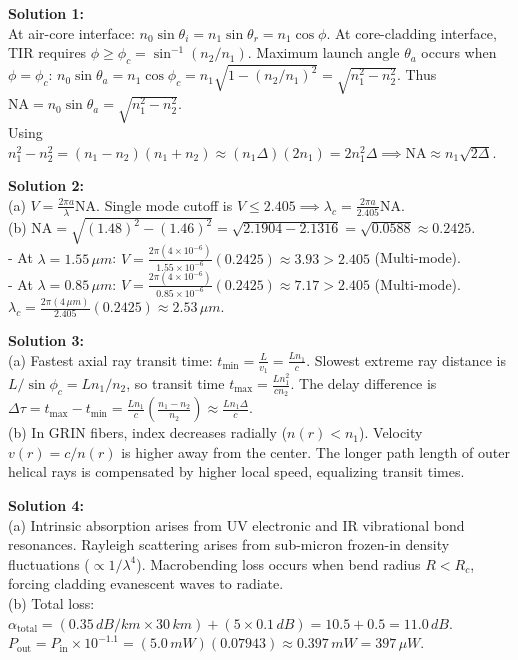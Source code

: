 \begin{solutionbox}
\textbf{Solution 1:}\\
At air-core interface: $n_0 \sin\theta_i = n_1 \sin\theta_r = n_1 \cos\phi$. At core-cladding interface, TIR requires $\phi \ge \phi_c = \sin^{-1}(n_2/n_1)$. Maximum launch angle $\theta_a$ occurs when $\phi = \phi_c$:
$n_0 \sin\theta_a = n_1 \cos\phi_c = n_1 \sqrt{1 - (n_2/n_1)^2} = \sqrt{n_1^2 - n_2^2}$. Thus $\text{NA} = n_0 \sin\theta_a = \sqrt{n_1^2 - n_2^2}$.\\
Using $n_1^2 - n_2^2 = (n_1 - n_2)(n_1 + n_2) \approx (n_1 \Delta)(2n_1) = 2 n_1^2 \Delta \implies \text{NA} \approx n_1 \sqrt{2\Delta}$.

\vspace{0.3cm}
\textbf{Solution 2:}\\
(a) $V = \frac{2\pi a}{\lambda}\text{NA}$. Single mode cutoff is $V \le 2.405 \implies \lambda_c = \frac{2\pi a}{2.405}\text{NA}$.\\
(b) $\text{NA} = \sqrt{(1.48)^2 - (1.46)^2} = \sqrt{2.1904 - 2.1316} = \sqrt{0.0588} \approx 0.2425$.\\
- At $\lambda = 1.55\,\si{\mu m}$: $V = \frac{2\pi (4 \times 10^{-6})}{1.55 \times 10^{-6}}(0.2425) \approx 3.93 > 2.405$ (Multi-mode).\\
- At $\lambda = 0.85\,\si{\mu m}$: $V = \frac{2\pi (4 \times 10^{-6})}{0.85 \times 10^{-6}}(0.2425) \approx 7.17 > 2.405$ (Multi-mode).\\
$\lambda_c = \frac{2\pi (4\,\si{\mu m})}{2.405}(0.2425) \approx 2.53\,\si{\mu m}$.

\vspace{0.3cm}
\textbf{Solution 3:}\\
(a) Fastest axial ray transit time: $t_{\text{min}} = \frac{L}{v_1} = \frac{L n_1}{c}$. Slowest extreme ray distance is $L/\sin\phi_c = L n_1 / n_2$, so transit time $t_{\text{max}} = \frac{L n_1^2}{c n_2}$. The delay difference is $\Delta \tau = t_{\text{max}} - t_{\text{min}} = \frac{L n_1}{c}\left(\frac{n_1 - n_2}{n_2}\right) \approx \frac{L n_1 \Delta}{c}$.\\
(b) In GRIN fibers, index decreases radially ($n(r) < n_1$). Velocity $v(r) = c/n(r)$ is higher away from the center. The longer path length of outer helical rays is compensated by higher local speed, equalizing transit times.

\vspace{0.3cm}
\textbf{Solution 4:}\\
(a) Intrinsic absorption arises from UV electronic and IR vibrational bond resonances. Rayleigh scattering arises from sub-micron frozen-in density fluctuations ($\propto 1/\lambda^4$). Macrobending loss occurs when bend radius $R < R_c$, forcing cladding evanescent waves to radiate.\\
(b) Total loss: $\alpha_{\text{total}} = (0.35\,\si{dB/km} \times 30\,\si{km}) + (5 \times 0.1\,\si{dB}) = 10.5 + 0.5 = 11.0\,\si{dB}$.\\
$P_{\text{out}} = P_{\text{in}} \times 10^{-1.1} = (5.0\,\si{mW})(0.07943) \approx 0.397\,\si{mW} = 397\,\si{\mu W}$.
\end{solutionbox}
